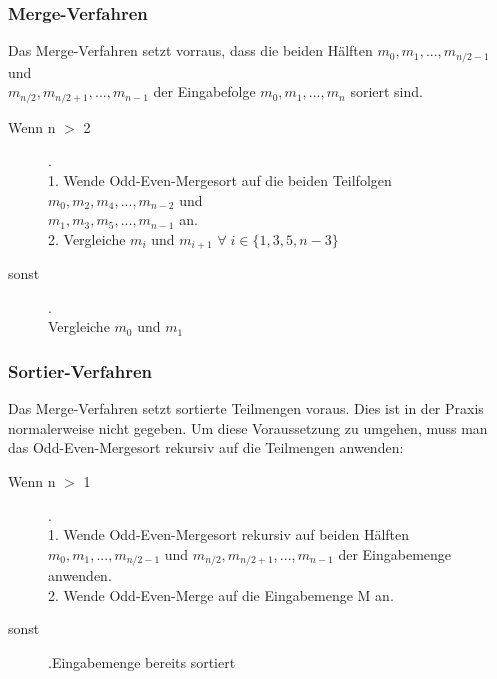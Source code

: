 \documentclass[11pt,ngerman]{article}
\begin{document}
\subsubsection{Merge-Verfahren}
Das Merge-Verfahren setzt vorraus, dass die beiden Hälften $m_0, m_1, ..., m_{n/2-1}$ und\\ $m_{n/2}, m_{n/2+1}, ..., m_{n-1}$ der Eingabefolge $m_0, m_1, ..., m_n$ soriert sind.
\begin{description}
\item[Wenn n $>$ 2] .\\1. Wende Odd-Even-Mergesort auf die beiden Teilfolgen \\$m_0, m_2, m_4, ..., m_{n-2}$ und \\$m_1, m_3, m_5, ..., m_{n-1}$ an.\\ 2. Vergleiche $m_i$ und $m_{i+1}$ $\forall \; i \in \{1, 3, 5, n-3\}$
\item[sonst].\\Vergleiche $m_0$ und $m_1$
\end{description}
\subsubsection{Sortier-Verfahren}
Das Merge-Verfahren setzt sortierte Teilmengen voraus. Dies ist in der Praxis normalerweise nicht gegeben.
Um diese Voraussetzung zu umgehen, muss man das Odd-Even-Mergesort rekursiv auf die Teilmengen anwenden:
\begin{description}
\item[Wenn n $>$ 1].\\1. Wende Odd-Even-Mergesort rekursiv auf beiden Hälften $m_0, m_1, ..., m_{n/2-1}$ und $m_{n/2}, m_{n/2+1}, ..., m_{n-1}$ der Eingabemenge anwenden.\\2. Wende Odd-Even-Merge auf die Eingabemenge M an.
\item[sonst].Eingabemenge bereits sortiert
\end{description}
\end{document}
